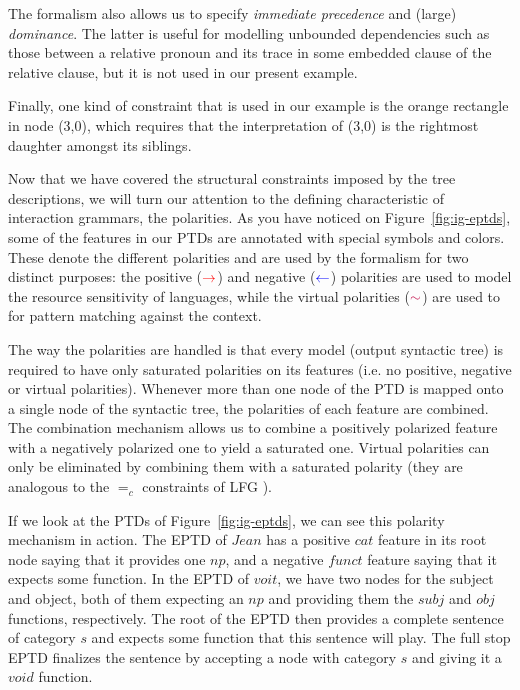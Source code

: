 The formalism also allows us to specify \emph{immediate precedence} and
(large) \emph{dominance}. The latter is useful for modelling unbounded
dependencies such as those between a relative pronoun and its trace in
some embedded clause of the relative clause, but it is not used in our
present example.

Finally, one kind of constraint that is used in our example is the
orange rectangle in node (3,0), which requires that the interpretation
of (3,0) is the rightmost daughter amongst its siblings.

Now that we have covered the structural constraints imposed by the tree
descriptions, we will turn our attention to the defining characteristic
of interaction grammars, the polarities. As you have noticed on
Figure~\ref{fig:ig-eptds}, some of the features in our PTDs are
annotated with special symbols and colors. These denote the different
polarities and are used by the formalism for two distinct purposes: the
positive ($\textcolor{red}{\rightarrow}$) and negative
($\textcolor{blue}{\leftarrow}$) polarities are used to model the
resource sensitivity of languages, while the virtual polarities
($\textcolor{purple}{\sim}$) are used to for pattern matching against
the context.

The way the polarities are handled is that every model (output syntactic
tree) is required to have only saturated polarities on its features
(i.e. no positive, negative or virtual polarities). Whenever more than
one node of the PTD is mapped onto a single node of the syntactic tree,
the polarities of each feature are combined. The combination mechanism
allows us to combine a positively polarized feature with a negatively
polarized one to yield a saturated one. Virtual polarities can only be
eliminated by combining them with a saturated polarity (they are
analogous to the $=_{c}$ constraints of LFG \cite{kaplan1982lexical}).

If we look at the PTDs of Figure~\ref{fig:ig-eptds}, we can see this
polarity mechanism in action. The EPTD of $Jean$ has a positive $cat$
feature in its root node saying that it provides one $np$, and a
negative $funct$ feature saying that it expects some function. In the
EPTD of $voit$, we have two nodes for the subject and object, both of
them expecting an $np$ and providing them the $subj$ and $obj$
functions, respectively. The root of the EPTD then provides a complete
sentence of category $s$ and expects some function that this sentence
will play. The full stop EPTD finalizes the sentence by accepting a node
with category $s$ and giving it a $void$ function.

